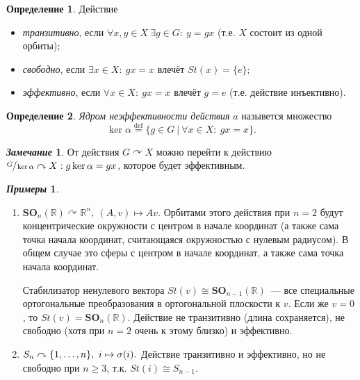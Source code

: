 \documentclass[a4paper, 14pt]{extarticle}
\newcommand{\deq}{\stackrel{\mathrm{def}}{=}}
\newcommand{\n}{\par}
\newcommand{\real}{\mathbb{R}}
\newcommand{\SOrth}{\mathbf{SO}}
\theoremstyle{definition}
\newtheorem*{exmpls}{\textit{Примеры}}
\newtheorem*{remark}{\textit{Замечание}}
\newtheorem{definition}{Определение}
\theoremstyle{plain}
\numberwithin{theorem}{section}
\numberwithin{definition}{section}
\numberwithin{statement}{section}
\numberwithin{lemma}{section}
\numberwithin{consequence}{section}
\begin{document}
        \begin{definition}
            Действие
            \begin{itemize}
                \item \textit{транзитивно}, если $\forall x,y \in X \ \exists g \in G{:} \ y = gx$ (т.е. $X$ состоит из одной орбиты);
                \item \textit{свободно}, если $\exists x \in X{:} \ gx = x$ влечёт $St(x) = \{e\};$
                \item \textit{эффективно}, если ${\forall x \in X{:} \ gx = x}$ влечёт ${g = e}$ (т.е. действие инъективно).
            \end{itemize}
        \end{definition}
        \begin{definition}
            \textit{Ядром неэффективности действия} $a$ назывется множество 
            \begin{equation*}
                \ker \alpha \deq \{g \in G \ | \ \forall x \in X{:} \ gx = x\}.
            \end{equation*}
        \end{definition}
        \begin{remark}
            От действия ${G \curvearrowright X}$ можно перейти к действию ${\sfrac{G}{\ker \alpha} \curvearrowright X : g \ker \alpha = gx}$, которое будет эффективным.
        \end{remark}
        \begin{exmpls}
            \
            \begin{enumerate}
                \item ${\SOrth_n(\real) \curvearrowright \real^n, \ (A,v) \mapsto Av.}$ Орбитами этого действия при ${n = 2}$ будут концентрические окружности с центром в начале координат (а также сама точка начала координат, считающаяся окружностью с нулевым радиусом). В общем случае это сферы с центром в начале координат, а также сама точка начала координат.\n
                Стабилизатор ненулевого вектора ${St(v) \cong \SOrth_{n - 1}(\real)}$~--- все специальные ортогональные преобразования в ортогональной плоскости к $v$. Если же $v = 0$, то $St(v) = \SOrth_n(\real)$.
                Действие не транзитивно (длина сохраняется), не свободно (хотя при ${n = 2}$ очень к этому близко) и эффективно.
                \item ${S_n \curvearrowright \{1,\mathellipsis, n\}, \ i \mapsto \sigma(i)}.$ Действие транзитивно и эффективно, но не свободно при $n \geqslant 3$, т.к. ${St(i) \cong S_{n-1}.}$ 
            \end{enumerate}
        \end{exmpls}
\end{document}
